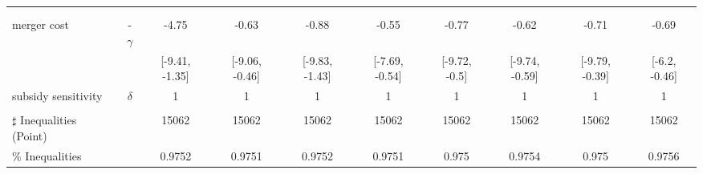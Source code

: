 \begin{tabular}{@{\extracolsep{5pt}}lccccccccc}
 &  &  &  &  &  &  &  &  &  \\
 &  &  &  &  &  &  &  &  &  \\
merger cost & -$\gamma$ & -4.75 & -0.63 & -0.88 & -0.55 & -0.77 & -0.62 & -0.71 & -0.69 \\
 &  & [-9.41, -1.35] & [-9.06, -0.46] & [-9.83, -1.43] & [-7.69, -0.54] & [-9.72, -0.5] & [-9.74, -0.59] & [-9.79, -0.39] & [-6.2, -0.46] \\
subsidy sensitivity & $\delta$ & 1 & 1 & 1 & 1 & 1 & 1 & 1 & 1 \\
 &  &  &  &  &  &  &  &  &  \\
\hline 
$\sharp$ Inequalities (Point) &  & 15062 & 15062 & 15062 & 15062 & 15062 & 15062 & 15062 & 15062 \\
\% Inequalities &  & 0.9752 & 0.9751 & 0.9752 & 0.9751 & 0.975 & 0.9754 & 0.975 & 0.9756 \\
\bottomrule 
\end{tabular}
